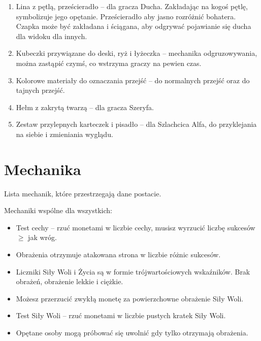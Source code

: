 \begin{enumerate}
		\item Lina z pętlą, prześcieradło -- dla gracza Ducha. Zakładając na kogoś pętlę, symbolizuje jego opętanie. Prześcieradło aby jasno rozróżnić bohatera. Czapka może być zakładana i ściągana, aby odgrywać pojawianie się ducha dla widoku dla innych.
		\item Kubeczki przywiązane do deski, ryż i łyżeczka -- mechanika odgruzowywania, można zastąpić czymś, co wstrzyma graczy na pewien czas.
		\item Kolorowe materiały do oznaczania przejść -- do normalnych przejść oraz do tajnych przejść.
		\item Hełm z zakrytą twarzą -- dla gracza Szeryfa.
		\item Zestaw przylepnych karteczek i pisadło -- dla Szlachcica Alfa, do przyklejania na siebie i zmieniania wyglądu.
	\end{enumerate}
	
\section{Mechanika}
	Lista mechanik, które przestrzegają dane postacie.
	
	Mechaniki wspólne dla wszystkich:
	\begin{itemize}
		\item Test cechy -- rzuć monetami w liczbie cechy, musisz wyrzucić liczbę sukcesów $\geqslant$ jak wróg.
		\item Obrażenia otrzymuje atakowana strona w liczbie różnic sukcesów.
		\item Liczniki Siły Woli i Życia są w formie trójwartościowych wskaźników. Brak obrażeń, obrażenie lekkie i ciężkie.
		\item Możesz przerzucić zwykłą monetę za powierzchowne obrażenie Siły Woli.
		\item Test Siły Woli -- rzuć monetami w liczbie pustych kratek Siły Woli.
		\item Opętane osoby mogą próbować się uwolnić gdy tylko otrzymają obrażenia.
	\end{itemize}

